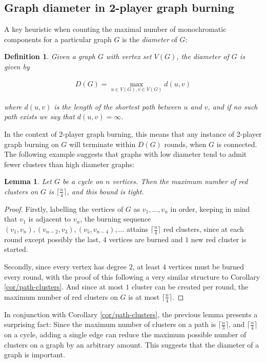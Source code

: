 \documentclass{mpaper}
\newtheorem{definition}{Definition}[section]
\newtheorem{lemma}{Lemma}[section]
\begin{document}
\subsection{Graph diameter in 2-player graph burning}

A key heuristic when counting the maximal number of monochromatic components for a particular graph $G$ is the \emph{diameter} of $G$:

\begin{definition}
\label{def/diameter}
  Given a graph $G$ with vertex set $V(G)$, the \emph{diameter} of $G$ is given by
  
  \begin{align*}
  D(G) = \max_{u \in V(G), v \in V(G)} d(u,v)
  \end{align*}

  where $d(u,v)$ is the length of the shortest path between $u$ and $v$, and if no such path exists we say that $d(u,v) = \infty$.
\end{definition}

In the context of 2-player graph burning, this means that any instance of 2-player graph burning on $G$ will terminate within $D(G)$ rounds, when $G$ is connected. The following example suggests that graphs with low diameter tend to admit fewer clusters than high diameter graphs:

\begin{lemma}
\label{lem/cycle-clusters}
  Let $G$ be a cycle on $n$ vertices. Then the maximum number of red clusters on $G$ is $\lceil \frac{n}{4} \rceil$, and this bound is tight.
\end{lemma}

\begin{proof}
  Firstly, labelling the vertices of $G$ as $v_1, \dots, v_n$ in order, keeping in mind that $v_1$ is adjacent to $v_n$, the burning sequence $(v_1, v_n), (v_{n-2}, v_3), (v_5, v_{n-4}), \dots$ attains $\lceil \frac{n}{4} \rceil$ red clusters, since at each round except possibly the last, $4$ vertices are burned and $1$ new red cluster is started.

  Secondly, since every vertex has degree $2$, at least $4$ vertices must be burned every round, with the proof of this following a very similar structure to Corollary \ref{cor/path-clusters}. And since at most $1$ cluster can be created per round, the maximum number of red clusters on $G$ is at most $\lceil \frac{n}{4} \rceil$.
\end{proof}

In conjunction with Corollary \ref{cor/path-clusters}, the previous lemma presents a surprising fact: Since the maximum number of clusters on a path is $\lceil \frac{n}{3} \rceil$, and $\lceil \frac{n}{4}\rceil$ on a cycle, adding a single edge can reduce the maximum possible number of clusters on a graph by an arbitrary amount. This suggests that the diameter of a graph is important.
\end{document}
